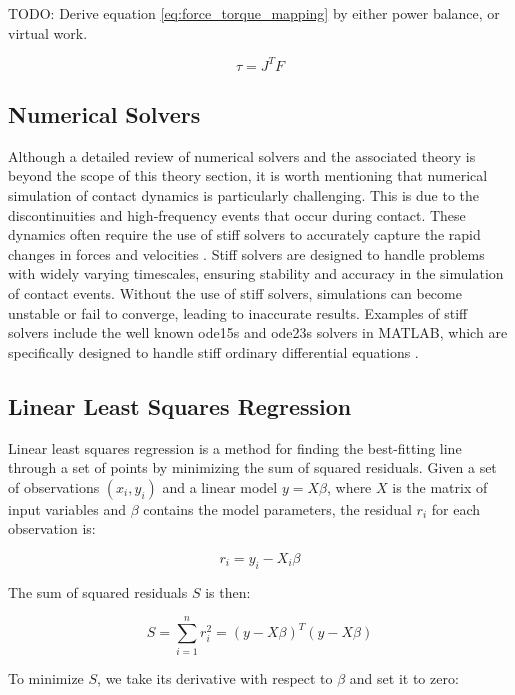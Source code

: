     TODO: Derive equation \ref{eq:force_torque_mapping} by either power balance, or virtual work. 

    \begin{equation}
        \label{eq:force_torque_mapping}
        \tau = J^T F
    \end{equation}

\subsection{Numerical Solvers}
\label{sec:numerical_solvers}

Although a detailed review of numerical solvers and the associated theory is beyond the scope of this theory section, it is worth mentioning that numerical simulation of contact dynamics is particularly challenging. This is due to the discontinuities and high-frequency events that occur during contact. These dynamics often require the use of stiff solvers to accurately capture the rapid changes in forces and velocities \cite{stiff_contact_ODE_1}\cite{stiff_contact_ODE_2}. Stiff solvers are designed to handle problems with widely varying timescales, ensuring stability and accuracy in the simulation of contact events. Without the use of stiff solvers, simulations can become unstable or fail to converge, leading to inaccurate results. Examples of stiff solvers include the well known ode15s and ode23s solvers in MATLAB, which are specifically designed to handle stiff ordinary differential equations \cite{MATLAB_ODE}. 



\subsection{Linear Least Squares Regression}
Linear least squares regression is a method for finding the best-fitting line through a set of points by minimizing the sum of squared residuals. Given a set of observations \((x_i, y_i)\) and a linear model \(y = X\beta\), where \(X\) is the matrix of input variables and \(\beta\) contains the model parameters, the residual \(r_i\) for each observation is:

\[
r_i = y_i - X_i\beta
\]

The sum of squared residuals \(S\) is then:

\[
S = \sum_{i=1}^n r_i^2 = (y - X\beta)^T(y - X\beta)
\]

To minimize \(S\), we take its derivative with respect to \(\beta\) and set it to zero:

